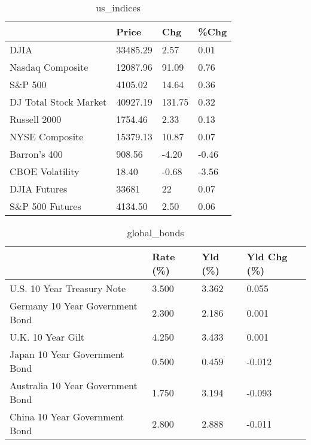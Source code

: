 \documentclass{article}%
\begin{document}
%


\begin{table}[htbp]%
\caption{us\_indices}%
\centering%
\begin{adjustbox}{width=1\textwidth}%
\begin{tabular}{llll}
\toprule
                      &    Price &    Chg &  \%Chg \\
\midrule
                 DJIA & 33485.29 &   2.57 &  0.01 \\
     Nasdaq Composite & 12087.96 &  91.09 &  0.76 \\
              S\&P 500 &  4105.02 &  14.64 &  0.36 \\
DJ Total Stock Market & 40927.19 & 131.75 &  0.32 \\
         Russell 2000 &  1754.46 &   2.33 &  0.13 \\
       NYSE Composite & 15379.13 &  10.87 &  0.07 \\
         Barron's 400 &   908.56 &  -4.20 & -0.46 \\
      CBOE Volatility &    18.40 &  -0.68 & -3.56 \\
         DJIA Futures &    33681 &     22 &  0.07 \\
      S\&P 500 Futures &  4134.50 &   2.50 &  0.06 \\
\bottomrule
\end{tabular}
%
\end{adjustbox}%
\end{table}

%


\begin{table}[htbp]%
\caption{global\_bonds}%
\centering%
\begin{adjustbox}{width=1\textwidth}%
\begin{tabular}{llll}
\toprule
                                  & Rate (\%) & Yld (\%) & Yld Chg (\%) \\
\midrule
       U.S. 10 Year Treasury Note &    3.500 &   3.362 &       0.055 \\
  Germany 10 Year Government Bond &    2.300 &   2.186 &       0.001 \\
                U.K. 10 Year Gilt &    4.250 &   3.433 &       0.001 \\
    Japan 10 Year Government Bond &    0.500 &   0.459 &      -0.012 \\
Australia 10 Year Government Bond &    1.750 &   3.194 &      -0.093 \\
    China 10 Year Government Bond &    2.800 &   2.888 &      -0.011 \\
\bottomrule
\end{tabular}
%
\end{adjustbox}%
\end{table}
\end{document}

